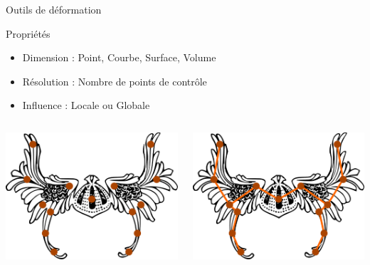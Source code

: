 \documentclass[xcolor=x11names,compress]{beamer}
\renewcommand{\(}{\begin{columns}} \renewcommand{\)}{\end{columns}}
\newcommand{\<}[1]{\begin{column}{#1}} \renewcommand{\>}{\end{column}}
\begin{document}
\begin{frame}{Outils de déformation}
  \begin{exampleblock}{Propriétés}
    \begin{itemize}
      \item Dimension : Point, Courbe, Surface, Volume
      \item Résolution : Nombre de points de contrôle
      \item Influence : Locale ou Globale
    \end{itemize}
  \end{exampleblock}
  \begin{columns}[t]
    \begin{column}{0.3\textwidth}
      \centering
      \includegraphics[scale=0.12]{Outil-Mono-Points}
    \end{column}
    \begin{column}{0.3\textwidth}
      \centering
      \includegraphics[scale=0.12]{Outil-Mono-Courbes}

\end{column}
\end{columns}
\end{frame}
\end{document}
